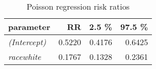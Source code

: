 \begin{wraptable}{r}{2in}

\caption{\label{tab:poisson_reg_RR}Poisson regression risk ratios}
\centering
\fontsize{9}{11}\selectfont
\begin{tabular}[t]{>{}lrrr}
\toprule
parameter & RR & 2.5 \% & 97.5 \%\\
\midrule
\em{(Intercept)} & 0.5220 & 0.4176 & 0.6425\\
\em{racewhite} & 0.1767 & 0.1328 & 0.2361\\
\bottomrule
\end{tabular}
\end{wraptable}
